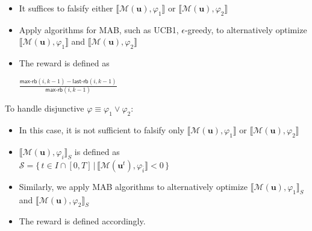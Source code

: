 \documentclass[a0paper,portrait]{baposter}
\newcommand{\bu}{\mathbf{u}}
\newcommand{\sem}[1]{\llbracket #1 \rrbracket}
\begin{document}
\begin{poster}
{\begin{minipage}[h]{0.45\textwidth}
 \begin{itemize}
 \vspace{-0.8em}
 \item It suffices to falsify either $\sem{\mathcal{M}(\bu), \varphi_1}$ or $\sem{\mathcal{M}(\bu), \varphi_2}$
 \vspace{-0.8em}
 \item Apply algorithms for MAB, such as UCB1, $\epsilon$-greedy, to alternatively optimize $\sem{\mathcal{M}(\bu), \varphi_1}$ and $\sem{\mathcal{M}(\bu), \varphi_2}$
 \vspace{-0.8em}
 \item The reward is defined as 

 $\displaystyle
 \frac{ \mathsf{max\text{-}rb}({i},k-1)
 - \mathsf{last\text{-}rb}({i},k-1)}{\mathsf{max\text{-}rb}({i},k-1)}$





 \end{itemize}
\end{minipage}
\begin{minipage}[h]{0.48\textwidth}
To handle disjunctive $\varphi\equiv\varphi_1\lor \varphi_2$:
\begin{itemize}
 \vspace{-0.8em}
\item In this case, it is not sufficient to falsify only $\sem{\mathcal{M}(\bu), \varphi_1}$ or $\sem{\mathcal{M}(\bu), \varphi_2}$
  \vspace{-0.8em}
 \item $\sem{\mathcal{M}(\bu), \varphi_i}_S$ is defined as\\
$\mathcal{S}=\bigl\{\,t\in I\cap [0,T]\,\big|\, \sem{\mathcal{M}(\bu^{t}), \varphi_{\overline{i}}}<0\,\bigr\}$
 \vspace{-0.8em}
 \item Similarly, we apply MAB algorithms to alternatively optimize $\sem{\mathcal{M}(\bu), \varphi_1}_S$ and $\sem{\mathcal{M}(\bu), \varphi_2}_S$
 \vspace{-0.8em}
 \item The reward is defined accordingly.
\end{itemize}
\end{minipage}

}






\end{poster}
\end{document}
